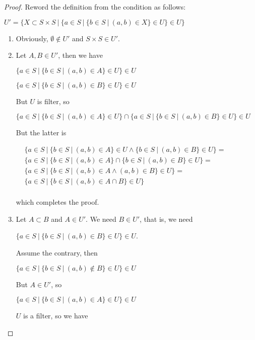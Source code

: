 \documentclass[8pt]{article}
\theoremstyle{definition}
\theoremstyle{definition}
\theoremstyle{definition}
\theoremstyle{definition}
\theoremstyle{definition}
\theoremstyle{definition}
\theoremstyle{definition}
\theoremstyle{definition}
\theoremstyle{definition}
\theoremstyle{definition}
\theoremstyle{definition}
\theoremstyle{definition}
\theoremstyle{definition}
\theoremstyle{definition}
\theoremstyle{question}
\begin{document}
\begin{proof}
  Reword the definition from the condition as follows:
  \begin{center}
    $U' = \{ X \subset S \times S \: | \: \{ a \in S \: | \: \{ b \in S \:| \: (a, b) \in X \} \in U\} \in U \}$
  \end{center}
  \begin{enumerate}
    \item Obviously, $\emptyset \notin U'$ and $S \times S \in U'$.
    \item Let $A, B \in U'$, then we have
    \begin{center}
      $\{ a \in S \: | \: \{ b \in S \:| \: (a, b) \in A \} \in U\} \in U $ 

      $\{ a \in S \: | \: \{ b \in S \:| \: (a, b) \in B \} \in U\} \in U $ 
    \end{center}

    But $U$ is filter, so
    \begin{center}
      $\{ a \in S \: | \: \{ b \in S \:| \: (a, b) \in A \} \in U\} \cap \{ a \in S \: | \: \{ b \in S \:| \: (a, b) \in B \} \in U\} \in U$
    \end{center}
    But the latter is
    \begin{center}
     $\begin{array}{lll}
     & \{ a \in S \: | \: \{ b \in S \:| \: (a, b) \in A \} \in U \land \{ b \in S \:| \: (a, b) \in B \} \in U \} = & \\
     & \{ a \in S \: | \: \{ b \in S \:| \: (a, b) \in A \} \cap \{ b \in S \:| \: (a, b) \in B \} \in U \} = & \\
     & \{ a \in S \: | \: \{ b \in S \: | \: (a, b) \in A \land (a, b) \in B \} \in U\} = & \\
     & \{ a \in S \: | \: \{ b \in S \: | \: (a, b) \in A \cap B \} \in U\}& \\
     \end{array}$
    \end{center}
    which completes the proof.
    \item Let $A \subset B$ and $A \in U'$. We need $B \in U'$, that is, we need
    \begin{center}
      $\{ a \in S \: | \: \{ b \in S \: | \: (a, b) \in B \} \in U \} \in U$.
    \end{center}
    Assume the contrary, then
    \begin{center}
      $\{ a \in S \: | \: \{ b \in S \: | \: (a, b) \notin B \} \in U \} \in U$
    \end{center}
    But $A \in U'$, so
    \begin{center}
      $\{ a \in S \: | \: \{ b \in S \:| \: (a, b) \in A \} \in U\} \in U$
    \end{center}
    $U$ is a filter, so we have
    

\end{enumerate}
\end{proof}
\end{document}
